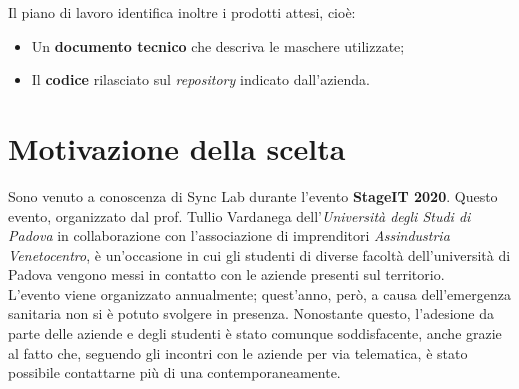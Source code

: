 Il piano di lavoro identifica inoltre i prodotti attesi, cioè:
\begin{itemize}
  \item Un \textbf{documento tecnico} che descriva le maschere utilizzate;
  \item Il \textbf{codice} rilasciato sul \textit{repository} indicato dall'azienda.
\end{itemize}


\section{Motivazione della scelta}

Sono venuto a conoscenza di Sync Lab durante l'evento \textbf{StageIT 2020}. Questo evento, organizzato dal prof. Tullio Vardanega dell'\textit{Università degli Studi di Padova} in collaborazione con l'associazione di imprenditori \textit{Assindustria Venetocentro}, è un'occasione in cui gli studenti di diverse facoltà dell'università di Padova vengono messi in contatto con le aziende presenti sul territorio. \\
L'evento viene organizzato annualmente; quest'anno, però, a causa dell'emergenza sanitaria non si è potuto svolgere in presenza. Nonostante questo, l'adesione da parte delle aziende e degli studenti è stato comunque soddisfacente, anche grazie al fatto che, seguendo gli incontri con le aziende per via telematica, è stato possibile contattarne più di una contemporaneamente. \\

